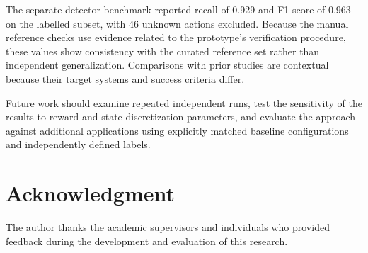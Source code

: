 \documentclass[conference]{IEEEtran}
\begin{document}
The separate detector benchmark reported recall of 0.929
and F1-score of 0.963 on the labelled subset, with 46 unknown
actions excluded. Because the manual reference checks use
evidence related to the prototype's verification procedure,
these values show consistency with the curated reference set
rather than independent generalization. Comparisons with
prior studies are contextual because their target systems and
success criteria differ.

Future work should examine repeated independent runs,
test the sensitivity of the results to reward and
state-discretization parameters, and evaluate the approach
against additional applications using explicitly matched
baseline configurations and independently defined labels.

\section*{Acknowledgment}

The author thanks the academic supervisors and individuals
who provided feedback during the development and evaluation
of this research.
\end{document}
